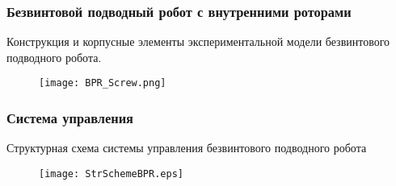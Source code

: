 \begin{frame}
\frametitle{Безвинтовой подводный робот с внутренними роторами}


Конструкция и корпусные элементы экспериментальной модели безвинтового подводного робота.

\begin{minipage}[t]{0.48\linewidth}
\end{minipage}
\hfill
\begin{minipage}[t]{0.48\linewidth}
\end{minipage}




\begin{figure}[h]
	\centering
	\texttt{[image: BPR\_Screw.png]}%
\end{figure}

\end{frame}


\begin{frame}
\frametitle{Система управления}
Структурная схема системы управления безвинтового подводного робота

\begin{figure}[h!]
	\begin{center}
		\texttt{[image: StrSchemeBPR.eps]}
	\end{center}
\end{figure}

\end{frame}

